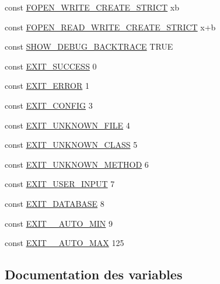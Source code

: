 \begin{DoxyCompactItemize}
const \hyperlink{constants_8php_a02007ca17f39af174ac54d30f2ca7e82}{F\+O\+P\+E\+N\+\_\+\+W\+R\+I\+T\+E\+\_\+\+C\+R\+E\+A\+T\+E\+\_\+\+S\+T\+R\+I\+CT} \textquotesingle{}xb\textquotesingle{}
\item 
const \hyperlink{constants_8php_a2eeb98a015d74560e9b60ec60d7531d4}{F\+O\+P\+E\+N\+\_\+\+R\+E\+A\+D\+\_\+\+W\+R\+I\+T\+E\+\_\+\+C\+R\+E\+A\+T\+E\+\_\+\+S\+T\+R\+I\+CT} \textquotesingle{}x+b\textquotesingle{}
\item 
const \hyperlink{constants_8php_a7e2dd6fea73799257285946411aeb5ce}{S\+H\+O\+W\+\_\+\+D\+E\+B\+U\+G\+\_\+\+B\+A\+C\+K\+T\+R\+A\+CE} T\+R\+UE
\item 
const \hyperlink{constants_8php_a44a73f871298e7befa219da1d96c4bf8}{E\+X\+I\+T\+\_\+\+S\+U\+C\+C\+E\+SS} 0
\item 
const \hyperlink{constants_8php_a0072a08da382eee32afd352989a3cfc2}{E\+X\+I\+T\+\_\+\+E\+R\+R\+OR} 1
\item 
const \hyperlink{constants_8php_a0c5a2fe588c43f68077982ecc971381e}{E\+X\+I\+T\+\_\+\+C\+O\+N\+F\+IG} 3
\item 
const \hyperlink{constants_8php_a9d94a7e06ea3247295ecf2f17f077b77}{E\+X\+I\+T\+\_\+\+U\+N\+K\+N\+O\+W\+N\+\_\+\+F\+I\+LE} 4
\item 
const \hyperlink{constants_8php_a7b2af799ecefe2b0471c319bafc26850}{E\+X\+I\+T\+\_\+\+U\+N\+K\+N\+O\+W\+N\+\_\+\+C\+L\+A\+SS} 5
\item 
const \hyperlink{constants_8php_aeb461d43337d49e2ba92c555caa8597c}{E\+X\+I\+T\+\_\+\+U\+N\+K\+N\+O\+W\+N\+\_\+\+M\+E\+T\+H\+OD} 6
\item 
const \hyperlink{constants_8php_af3a83fa2732cd58b95a81a858b18e4ab}{E\+X\+I\+T\+\_\+\+U\+S\+E\+R\+\_\+\+I\+N\+P\+UT} 7
\item 
const \hyperlink{constants_8php_a64406bc73261c35be6e74855a149ad68}{E\+X\+I\+T\+\_\+\+D\+A\+T\+A\+B\+A\+SE} 8
\item 
const \hyperlink{constants_8php_adfa393658ac3789382a67aae1519af8f}{E\+X\+I\+T\+\_\+\+\_\+\+A\+U\+T\+O\+\_\+\+M\+IN} 9
\item 
const \hyperlink{constants_8php_ac8895d88dadde460367dbf922ddfc194}{E\+X\+I\+T\+\_\+\+\_\+\+A\+U\+T\+O\+\_\+\+M\+AX} 125
\end{DoxyCompactItemize}


\subsection{Documentation des variables}
\mbox{\label{constants_8php_a5eb43292f0c56482a7869db8adb1c91d}} 
